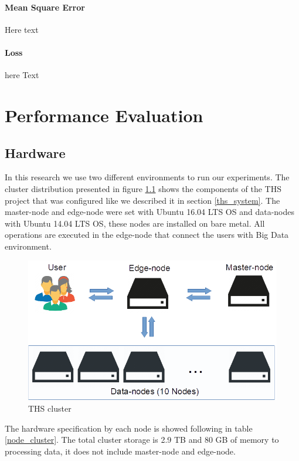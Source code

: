\documentclass[12pt]{report}
\begin{document}
\subsubsection{Mean Square Error}
Here text
\subsubsection{Loss}
here Text

\chapter{Performance Evaluation} \label{chapter 5}
\section{Hardware} 

In this research we use two different environments to run our experiments. The cluster distribution presented in figure \ref{figure:ths_cluster} shows the components of the \ac{THS} project that was configured like we described it in section \ref{ths_system}. The master-node and edge-node were set with Ubuntu 16.04 LTS \ac{OS} and data-nodes with Ubuntu 14.04 LTS \ac{OS}, these nodes are installed on bare metal. All operations are executed in the edge-node that connect the users with Big Data environment.

\begin{figure}[H]	
	\centering
	\includegraphics[width=150mm, scale = 1]{images/7_ths_cluster.png}	
	\caption{\ac{THS} cluster}	
	\label{figure:ths_cluster}
\end{figure}

The hardware specification by each node is showed following in table \ref{node_cluster}. The total cluster storage is 2.9 TB and 80 GB of memory to processing data, it does not include master-node and edge-node.
\end{document}
